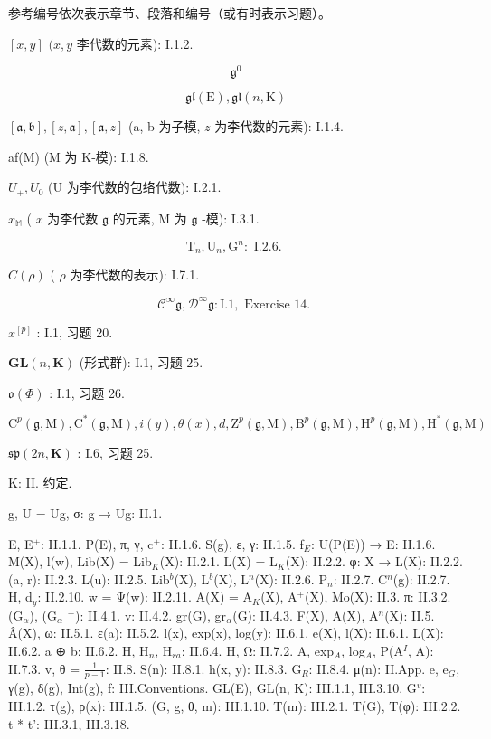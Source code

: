 
参考编号依次表示章节、段落和编号（或有时表示习题）。

\([x,y]\) \((x,y\) 李代数的元素): I.1.2.

\[
\mathfrak {g} ^ {0}
\]

\[
\mathfrak {g l} (\mathrm{E}), \mathfrak {g l} (n, \mathrm{K})
\]

\([\mathfrak{a},\mathfrak{b}],[z,\mathfrak{a}],[\mathfrak{a},z]\) (a, b 为子模, \(z\) 为李代数的元素): I.1.4.

af(M) (M 为 K-模): I.1.8.

\(U_{+}, U_{0}\) (U 为李代数的包络代数): I.2.1.

\(x_{\mathbb{M}}\) ( \(x\) 为李代数 \(\mathfrak{g}\) 的元素, M 为 \(\mathfrak{g}\) -模): I.3.1.

\[
\mathrm{T} _ {n}, \mathrm{U} _ {n}, \mathrm{G} ^ {n}: \text { I.2.6. }
\]

\(C(\rho)\) ( \(\rho\) 为李代数的表示): I.7.1.

\[
\mathcal {C} ^ {\infty} \mathfrak {g}, \mathcal {D} ^ {\infty} \mathfrak {g}: \mathrm{I}. 1, \text { Exercise 14. }
\]

\(x^{[p]}\) : I.1, 习题 20.

\(\mathbf{GL}(n,\mathbf{K})\) (形式群): I.1, 习题 25.

\(\mathfrak{o}(\Phi)\) : I.1, 习题 26.

\[
\mathrm{C} ^ {p} (\mathfrak {g}, \mathrm{M}), \mathrm{C} ^ {*} (\mathfrak {g}, \mathrm{M}), i (y), \theta (x), d, \mathrm{Z} ^ {p} (\mathfrak {g}, \mathrm{M}), \mathrm{B} ^ {p} (\mathfrak {g}, \mathrm{M}), \mathrm{H} ^ {p} (\mathfrak {g}, \mathrm{M}), \mathrm{H} ^ {*} (\mathfrak {g}, \mathrm{M})
\]

\(\mathfrak{sp}(2n,\mathbf{K})\) : I.6, 习题 25.

K: II. 约定.

g, U = Ug, σ: g → Ug: II.1.

E, E\(^{+}\): II.1.1. P(E), π, γ, c\(^{+}\): II.1.6. S(g), ε, γ: II.1.5. f\(_{E}\): U(P(E)) → E: II.1.6. M(X), l(w), Lib(X) = Lib\(_{K}\)(X): II.2.1. L(X) = L\(_{K}\)(X): II.2.2. φ: X → L(X): II.2.2. (a, r): II.2.3. L(u): II.2.5. Lib\(^{b}\)(X), L\(^{b}\)(X), L\(^{n}\)(X): II.2.6. P\(_{n}\): II.2.7. C\(^{n}\)(g): II.2.7. H, d\(_{y}\): II.2.10. w = Ψ(w): II.2.11. A(X) = A\(_{K}\)(X), A\(^{+}\)(X), Mo(X): II.3. π: II.3.2. (G\(_{\alpha}\)), (G\(_{\alpha}\) \(^{+}\)): II.4.1. v: II.4.2. gr(G), gr\(_{\alpha}\)(G): II.4.3. F(X), A(X), A\(^{n}\)(X): II.5. Â(X), ω: II.5.1. ε(a): II.5.2. l(x), exp(x), log(y): II.6.1. e(X), l(X): II.6.1. L(X): II.6.2. a ⊕ b: II.6.2. H, H\(_{n}\), H\(_{ra}\): II.6.4. H, Ω: II.7.2. A, exp\(_{A}\), log\(_{A}\), P(A\(^{I}\), A): II.7.3. v, θ = \(\frac{1}{p - 1}\): II.8. S(n): II.8.1. h(x, y): II.8.3. G\(_{R}\): II.8.4. μ(n): II.App. e, e\(_{G}\), γ(g), δ(g), Int(g), f: III.Conventions. GL(E), GL(n, K): III.1.1, III.3.10. G\(^{v}\): III.1.2. τ(g), ρ(x): III.1.5. (G, g, θ, m): III.1.10. T(m): III.2.1. T(G), T(φ): III.2.2. t * t': III.3.1, III.3.18.

